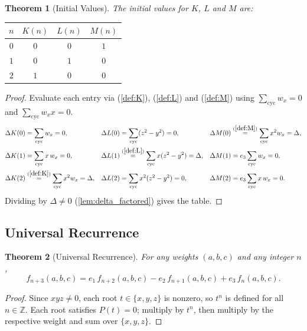 \documentclass[12pt]{article}
\newtheorem{theorem}{Theorem}[section]
\theoremstyle{definition}
\newcommand{\cycsum}[1]{\sum_{\mathrm{cyc}}#1}
\begin{document}
	\begin{theorem}[Initial Values]
		\label{thm:initial_values}
		The initial values for $K$, $L$ and $M$ are:
		\begin{center}
			\begin{tabular}{c|ccc}
				$n$ & $K(n)$ & $L(n)$ & $M(n)$ \\
				\hline
				$0$ & $0$ & $0$ & $1$ \\
				$1$ & $0$ & $1$ & $0$ \\
				$2$ & $1$ & $0$ & $0$ \\
			\end{tabular}
		\end{center}
	\end{theorem}
	\begin{proof}
		Evaluate each entry via (\ref{def:K}), (\ref{def:L}) and (\ref{def:M}) using $\cycsum{w_x} = 0$ and $\cycsum{w_x}x = 0$.
		\begin{align*}
			\Delta K(0) &= \cycsum{w_x} = 0, &
			\Delta L(0) &= \cycsum{(z^2-y^2)} = 0, &
			\Delta M(0) &\overset{(\ref{def:M})}{=} \cycsum{x^2 w_x} = \Delta, \\
			\Delta K(1) &= \cycsum{x\,w_x} = 0, &
			\Delta L(1) &\overset{(\ref{def:L})}{=} \cycsum{x(z^2-y^2)} = \Delta, &
			\Delta M(1) &= e_3\cycsum{w_x} = 0, \\
			\Delta K(2) &\overset{(\ref{def:K})}{=} \cycsum{x^2 w_x} = \Delta, &
			\Delta L(2) &= \cycsum{x^2(z^2-y^2)} = 0, &
			\Delta M(2) &= e_3\cycsum{x\,w_x} = 0.
		\end{align*}
		Dividing by $\Delta \neq 0$ (\ref{lem:delta_factored}) gives the table.
	\end{proof}
	
	\subsection{Universal Recurrence}
	
	\begin{theorem}[Universal Recurrence]
		\label{thm:universal_recurrence}
		For any weights $(a, b, c)$ and any integer $n$,
		\[ f_{n+3}(a,b,c) = e_1\, f_{n+2}(a,b,c) - e_2\, f_{n+1}(a,b,c) + e_3\, f_n(a,b,c). \]
	\end{theorem}
	\begin{proof}
		Since $xyz \neq 0$, each root $t \in \{x,y,z\}$ is nonzero, so $t^n$ is defined for all $n \in \mathbb{Z}$. Each root satisfies $P(t) = 0$; multiply by $t^n$, then multiply by the respective weight and sum over $\{x,y,z\}$.
	\end{proof}
	
\end{document}
